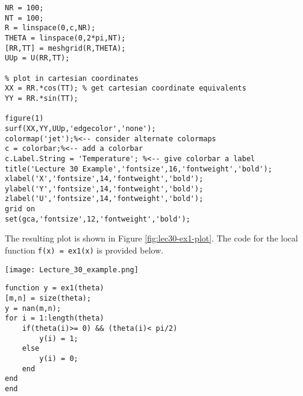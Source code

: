 \begin{lstlisting}[name=lec30-ex1,style=myMatlab]
%% Make a Plot
NR = 100;
NT = 100;
R = linspace(0,c,NR);
THETA = linspace(0,2*pi,NT);
[RR,TT] = meshgrid(R,THETA);
UUp = U(RR,TT);

% plot in cartesian coordinates
XX = RR.*cos(TT); % get cartesian coordinate equivalents
YY = RR.*sin(TT);

figure(1)
surf(XX,YY,UUp,'edgecolor','none');
colormap('jet');%<-- consider alternate colormaps
c = colorbar;%<-- add a colorbar
c.Label.String = 'Temperature'; %<-- give colorbar a label
title('Lecture 30 Example','fontsize',16,'fontweight','bold');
xlabel('X','fontsize',14,'fontweight','bold');
ylabel('Y','fontsize',14,'fontweight','bold');
zlabel('U','fontsize',14,'fontweight','bold');
grid on
set(gca,'fontsize',12,'fontweight','bold');
\end{lstlisting}
The resulting plot is shown in Figure \ref{fig:lec30-ex1-plot}.  The code for the local function \lstinline[style=myMatlab]{f(x) = ex1(x)} is provided below.
\begin{marginfigure}
\texttt{[image: Lecture\_30\_example.png]}
\caption{Solution for the case where \lstinline[style=myMatlab]{f(x) = ex1(x)}.}
\label{fig:lec30-ex1-plot}
\end{marginfigure}

\begin{lstlisting}[name=lec30-ex1, style=myMatlab]
%% Local functions
function y = ex1(theta)
[m,n] = size(theta);
y = nan(m,n);
for i = 1:length(theta)
    if(theta(i)>= 0) && (theta(i)< pi/2)
        y(i) = 1;
    else
        y(i) = 0;
    end
end    
end
\end{lstlisting}

